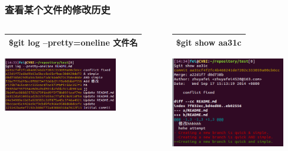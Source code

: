 \documentclass[notheorems,mathserif,table,compress]{beamer}  %
\begin{document}



\begin{frame}
  \frametitle{查看某个文件的修改历史}
  \begin{tcolorbox}[colback=blue!5,colframe=blue!75!black] 
  \begin{columns}
  \begin{column}{0.5\textwidth}
  \begin{center}
  \begin{tabular}{|l|}
  \hline
  \$git log --pretty=oneline 文件名\\
  \hline
  \end{tabular}
  \includegraphics[width=5cm]{log.png}
  \end{center}
  \end{column}

  \begin{column}{0.5\textwidth}
  \begin{center}
  \begin{tabular}{|l|}
  \hline
  \$git show aa31c\\
  \hline
  \end{tabular}
  \includegraphics[width=5cm]{gitshow.png}
  \end{center}
  \end{column}
  \end{columns}
  \end{tcolorbox}
\end{frame}
\end{document}
